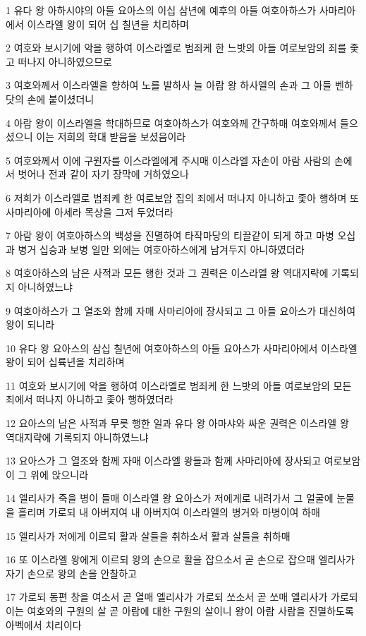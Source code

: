 \par 1 유다 왕 아하시야의 아들 요아스의 이십 삼년에 예후의 아들 여호아하스가 사마리아에서 이스라엘 왕이 되어 십 칠년을 치리하며
\par 2 여호와 보시기에 악을 행하여 이스라엘로 범죄케 한 느밧의 아들 여로보암의 죄를 좇고 떠나지 아니하였으므로
\par 3 여호와께서 이스라엘을 향하여 노를 발하사 늘 아람 왕 하사엘의 손과 그 아들 벤하닷의 손에 붙이셨더니
\par 4 아람 왕이 이스라엘을 학대하므로 여호아하스가 여호와께 간구하매 여호와께서 들으셨으니 이는 저희의 학대 받음을 보셨음이라
\par 5 여호와께서 이에 구원자를 이스라엘에게 주시매 이스라엘 자손이 아람 사람의 손에서 벗어나 전과 같이 자기 장막에 거하였으나
\par 6 저희가 이스라엘로 범죄케 한 여로보암 집의 죄에서 떠나지 아니하고 좇아 행하며 또 사마리아에 아세라 목상을 그저 두었더라
\par 7 아람 왕이 여호아하스의 백성을 진멸하여 타작마당의 티끌같이 되게 하고 마병 오십과 병거 십승과 보병 일만 외에는 여호아하스에게 남겨두지 아니하였더라
\par 8 여호아하스의 남은 사적과 모든 행한 것과 그 권력은 이스라엘 왕 역대지략에 기록되지 아니하였느냐
\par 9 여호아하스가 그 열조와 함께 자매 사마리아에 장사되고 그 아들 요아스가 대신하여 왕이 되니라
\par 10 유다 왕 요아스의 삼십 칠년에 여호아하스의 아들 요아스가 사마리아에서 이스라엘 왕이 되어 십륙년을 치리하며
\par 11 여호와 보시기에 악을 행하여 이스라엘로 범죄케 한 느밧의 아들 여로보암의 모든 죄에서 떠나지 아니하고 좇아 행하였더라
\par 12 요아스의 남은 사적과 무릇 행한 일과 유다 왕 아마샤와 싸운 권력은 이스라엘 왕 역대지략에 기록되지 아니하였느냐
\par 13 요아스가 그 열조와 함께 자매 이스라엘 왕들과 함께 사마리아에 장사되고 여로보암이 그 위에 앉으니라
\par 14 엘리사가 죽을 병이 들매 이스라엘 왕 요아스가 저에게로 내려가서 그 얼굴에 눈물을 흘리며 가로되 내 아버지여 내 아버지여 이스라엘의 병거와 마병이여 하매
\par 15 엘리사가 저에게 이르되 활과 살들을 취하소서 활과 살들을 취하매
\par 16 또 이스라엘 왕에게 이르되 왕의 손으로 활을 잡으소서 곧 손으로 잡으매 엘리사가 자기 손으로 왕의 손을 안찰하고
\par 17 가로되 동편 창을 여소서 곧 열매 엘리사가 가로되 쏘소서 곧 쏘매 엘리사가 가로되 이는 여호와의 구원의 살 곧 아람에 대한 구원의 살이니 왕이 아람 사람을 진멸하도록 아벡에서 치리이다
